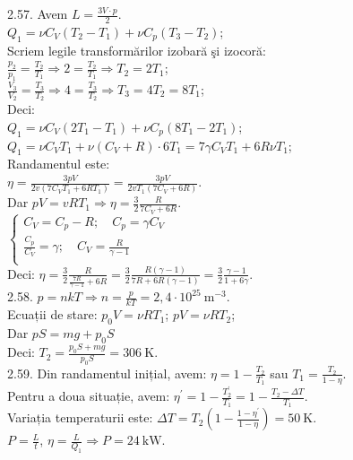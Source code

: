 2.57. Avem $L=\frac{3 V \cdot p}{2}$.\\ $Q_{1}=\nu C_{V}\left(T_{2}-T_{1}\right)+\nu C_{p}\left(T_{3}-T_{2}\right)$;\\ Scriem legile transformărilor izobară şi izocoră:\\  $\frac{p_{2}}{p_{1}}=\frac{T_{2}}{T_{1}} \Rightarrow 2=\frac{T_{2}}{T_{1}} \Rightarrow T_{2}=2 T_{1}$;\\ $\frac{V_{3}}{V_{2}}=\frac{T_{3}}{T_{2}} \Rightarrow 4=\frac{T_{3}}{T_{2}} \Rightarrow T_{3}=4 T_{2}=8 T_{1}$;\\ Deci:\\ $Q_{1}=\nu C_{V}\left(2 T_{1}-T_{1}\right)+\nu C_{p}\left(8 T_{1}-2 T_{1}\right)$;\\ $Q_{1}=\nu C_{V} T_{1}+\nu\left(C_{V}+R\right) \cdot 6 T_{1}=7 \gamma C_{V} T_{1}+6 R \nu T_{1}$;\\ Randamentul este:\\ $\eta=\frac{3 p V}{2 v\left(7 C_{V} T_{1}+6 R T_{1}\right)}=\frac{3 p V}{2 v T_{1}\left(7 C_{V}+6 R\right)}$.\\ Dar $p V=v R T_{1} \Rightarrow \eta=\frac{3}{2} \frac{R}{7 C_{V}+6 R}$.\\ $\left\{\begin{array}{ll} C_{V}=C_{p}-R; \quad C_{p}=\gamma C_{V}\\ \frac{C_{p}}{C_{V}}=\gamma; \quad C_{V}=\frac{R}{\gamma-1}\\ \end{array}\right.$\\ Deci: $\eta=\frac{3}{2} \frac{R}{\frac{7 R}{\gamma-1}+6 R}=\frac{3}{2} \frac{R(\gamma-1)}{7 R+6 R(\gamma-1)}=\frac{3}{2} \frac{\gamma-1}{1+6 \gamma}$.\\

2.58. $p=n k T \Rightarrow n=\frac{p}{k T}=2,4 \cdot 10^{25} \mathrm{~m}^{-3}$.\\ Ecuații de stare: $p_{0} V=\nu R T_{1}$; \quad $p V=\nu R T_{2}$;\\ Dar $p S=m g+p_{0} S$\\ Deci: $T_{2}=\frac{p_{0} S+m g}{p_{0} S}=306 \mathrm{~K}$.\\

2.59. Din randamentul inițial, avem: $\eta=1-\frac{T_{2}}{T_{1}}$ sau $T_{1}=\frac{T_{2}}{1-\eta}$.\\ Pentru a doua situație, avem: $\eta^{\prime}=1-\frac{T_{2}^{\prime}}{T_{1}}=1-\frac{T_{2}-\Delta T}{T_{1}}$.\\ Variația temperaturii este: $\Delta T=T_{2}\left(1-\frac{1-\eta^{\prime}}{1-\eta}\right)=50 \mathrm{~K}$.\\ $P=\frac{L}{t}$, $\eta=\frac{L}{Q_{1}} \Rightarrow P=24 \mathrm{~kW}$.\\

